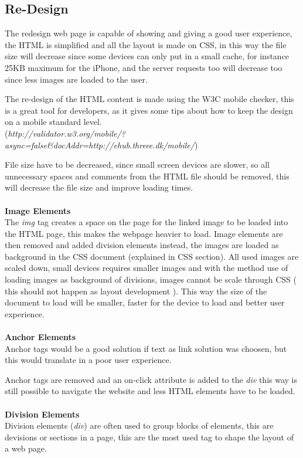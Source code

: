 \subsection{Re-Design}

The redesign web page is capable of showing and giving a good user experience, the HTML is simplified and all the layout is made on CSS, in this way the file size will decrease  since some devices can only put in a small cache, for instance 25KB maximum for the iPhone, and the server requests too will decrease too since less images are loaded to the user.

The re-design of the HTML content is made using the W3C mobile checker, this is a great tool for developers, as it gives some tips about how to keep the design on a mobile standard level. \\(\textit{http://validator.w3.org/mobile/?async=false\&docAddr=http://ehub.threee.dk/mobile/})

File size have to be decreased, since small screen devices are slower, so all unnecessary spaces and comments from the HTML file should be removed, this will decrease the file size and improve loading times.
\\\\
\textbf{Image Elements}\\
The \textit{img} tag creates a space on the page for the linked image to be loaded into the HTML page, this makes the webpage heavier to load.
Image elements are then removed and added division elements instead, the images are loaded as background in the CSS document (explained in CSS section).
All used images are scaled down, small devices requires smaller images and with the method use of loading images as background of divisions, images cannot be scale through CSS ( this should not happen as layout development ). This way the size of the document to load will be smaller, faster for the device to load and better user experience.
\\\\
\textbf{Anchor Elements}\\
Anchor tags would be a good solution if text as link solution was choosen, but this would translate in a poor user experience. 

Anchor tags are removed and an on-click attribute is added to the \textit{div} this way is still possible to navigate the website and less HTML elements have to be loaded. 
\\\\
\textbf{Division Elements}\\
Division elements (\textit{div}) are often used to group blocks of elements, this are devisions or sections in a page, this are the most used tag to shape the layout of a web page.


